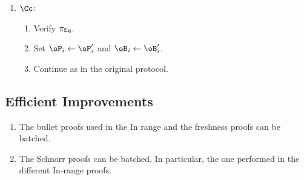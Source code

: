 \begin{enumerate}
\begin{enumerate}
\begin{enumerate}
			
			\item Generate a fresh  encryption $\oB_i'$ of $(p_i +b_i )$ and $\oP_i'$ of $0$.
			
			\item Generate a proof $\pi_\Eqs$ (\ie using \pZK{\rEq})   that $\oP_i+\oB_i = \oP_i'+ \oB_i'$.
			
			
			
			\item Send $(\oP_i',\oB_i',\pi_\Eqs,\pi^P_\FshS,\pi^B_\FshS)$ to \Cc.
			\item Send $(\oP_i',\oB_i',\pi_\Eqs)$ to \Cc.
		
		
		\end{enumerate}
		
		\item $\Cc$:
			\begin{enumerate}
				
					\item Verify $\pi_\Eqs$.
				
				\item Set $\oP_i  \asn \oP_i'$  and $\oB_i  \asn \oB_i'$.
				
				\item Continue as in the original protocol.
			\end{enumerate}
		
	\end{enumerate}
\end{enumerate}


\subsection{Efficient Improvements}\label{sec:ChanksEg:EfficientImp}

\begin{enumerate}
	\item The bullet proofs used  in the In range and the freshness proofs can be batched. 
	
	\item The Schnorr proofs can be batched. In particular, the one performed in the different In-range proofs.  
\end{enumerate}



\newcommand{\tdKg}{\MathAlgX{TshGen}}

